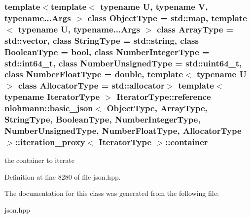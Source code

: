 \subsubsection[{container}]{\setlength{\rightskip}{0pt plus 5cm}template$<$template$<$ typename U, typename V, typename...\+Args $>$ class Object\+Type = std\+::map, template$<$ typename U, typename...\+Args $>$ class Array\+Type = std\+::vector, class String\+Type  = std\+::string, class Boolean\+Type  = bool, class Number\+Integer\+Type  = std\+::int64\+\_\+t, class Number\+Unsigned\+Type  = std\+::uint64\+\_\+t, class Number\+Float\+Type  = double, template$<$ typename U $>$ class Allocator\+Type = std\+::allocator$>$ template$<$typename Iterator\+Type $>$ Iterator\+Type\+::reference {\bf nlohmann\+::basic\+\_\+json}$<$ Object\+Type, Array\+Type, String\+Type, Boolean\+Type, Number\+Integer\+Type, Number\+Unsigned\+Type, Number\+Float\+Type, Allocator\+Type $>$\+::{\bf iteration\+\_\+proxy}$<$ Iterator\+Type $>$\+::container\hspace{0.3cm}{\ttfamily [private]}}\label{classnlohmann_1_1basic__json_1_1iteration__proxy_a07048776258c709360bc0e46e261ee64}


the container to iterate 



Definition at line 8280 of file json.\+hpp.



The documentation for this class was generated from the following file\+:\begin{DoxyCompactItemize}
\item 
json.\+hpp\end{DoxyCompactItemize}
